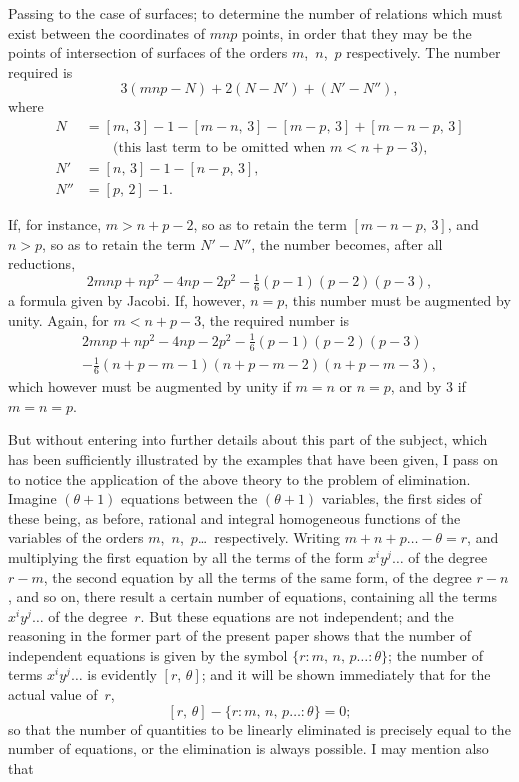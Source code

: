 \documentclass[11pt,a4paper]{article}
\begin{document}
Passing to the case of surfaces; to determine the number of relations which must exist between the coordinates of $mnp$ points, in order that they may be the points of intersection of surfaces of the orders $m$,~$n$,~$p$ respectively. The number required is
\[
3(mnp - N) + 2(N-N') + (N'-N''),
\]
where
\begin{align*}
N &= [m,\,3] - 1 - [m-n,\,3] - [m-p,\,3] + [m-n-p,\,3] \\
  &\qquad\text{(this last term to be omitted when $m < n+p-3$),}\\
N' &= [n,\,3] - 1 - [n-p,\,3],\\
N'' &= [p,\,2] - 1.
\end{align*}

If, for instance, $m > n+p-2$, so as to retain the term $[m-n-p,\,3]$, and $n > p$, so as to retain the term $N'-N''$, the number becomes, after all reductions,
\[
2mnp + np^2 - 4np - 2p^2 - \tfrac{1}{6}(p-1)(p-2)(p-3),
\]
a formula given by Jacobi. If, however, $n=p$, this number must be augmented by unity. Again, for $m < n+p-3$, the required number is
\begin{multline*}
2mnp + np^2 - 4np - 2p^2 - \tfrac{1}{6}(p-1)(p-2)(p-3) \\
- \tfrac{1}{6}(n+p-m-1)(n+p-m-2)(n+p-m-3),
\end{multline*}
which however must be augmented by unity if $m=n$ or $n=p$, and by $3$ if $m=n=p$.

But without entering into further details about this part of the subject, which has been sufficiently illustrated by the examples that have been given, I pass on to notice the application of the above theory to the problem of elimination. Imagine $(\theta+1)$ equations between the $(\theta+1)$ variables, the first sides of these being, as before, rational and integral homogeneous functions of the variables of the orders $m$,~$n$,~$p$\ldots\ respectively. Writing $m+n+p\ldots - \theta = r$, and multiplying the first equation by all the terms of the form $x^i y^j \ldots$ of the degree $r-m$, the second equation by all the terms of the same form, of the degree $r-n$, and so on, there result a certain number of equations, containing all the terms $x^i y^j \ldots$ of the degree~$r$. But these equations are not independent; and the reasoning in the former part of the present paper shows that the number of independent equations is given by the symbol $\{r : m,\, n,\, p\ldots : \theta\}$; the number of terms $x^i y^j \ldots$ is evidently $[r,\,\theta]$; and it will be shown immediately that for the actual value of~$r$,
\[
[r,\,\theta] - \{r : m,\, n,\, p\ldots : \theta\} = 0 \tag{B};
\]
so that the number of quantities to be linearly eliminated is precisely equal to the number of equations, or the elimination is always possible. I may mention also that
\end{document}
